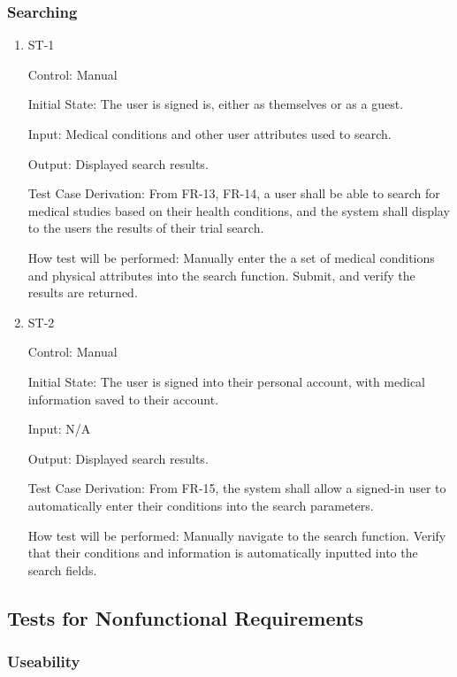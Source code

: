 \documentclass[12pt, titlepage]{article}
\begin{document}
\subsubsection{Searching}

\begin{enumerate}

\item{ST-1\\}

Control: Manual
					
Initial State: The user is signed is, either as themselves or as a guest.
					
Input: Medical conditions and other user attributes used to search.
					
Output: Displayed search results.

Test Case Derivation: From FR-13, FR-14, a user shall be able to search for medical studies based on their health conditions, and the system shall display to the users the results of their trial search.

How test will be performed: Manually enter the a set of medical conditions and physical attributes into the search function. Submit, and verify the results are returned.


\item{ST-2\\}

Control: Manual
					
Initial State: The user is signed into their personal account, with medical information saved to their account.
					
Input: N/A
					
Output: Displayed search results.

Test Case Derivation: From FR-15, the system shall allow a signed-in user to automatically enter their conditions into the search parameters.

How test will be performed: Manually navigate to the search function. Verify that their conditions and information is automatically inputted into the search fields.

\end{enumerate}

\subsection{Tests for Nonfunctional Requirements}

\subsubsection{Useability}
\end{document}
